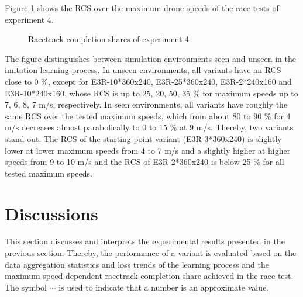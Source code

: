 Figure \ref{fig:e4_racing} shows the
RCS over the maximum drone speeds
of the race tests of experiment 4.
\begin{figure}
    \centering
    \hspace*{0cm}
    \par
    \caption[
        Racetrack completion shares of experiment 4
    ]{
        Racetrack completion shares of experiment 4
        \label{fig:e4_racing}
    }
\end{figure}
The figure distinguishes between simulation environments seen and unseen in the imitation learning process.
In unseen environments,
all variants have an RCS close to 0 \%,
except for E3R-10*360x240, E3R-25*360x240, E3R-2*240x160 and E3R-10*240x160,
whose RCS is up to 25, 20, 50, 35 \% for maximum speeds up to 7, 6, 8, 7 m/s, respectively.
In seen environments,
all variants have roughly the same RCS over the tested maximum speeds,
which from about 80 to 90 \% for 4 m/s decreases
almost parabolically to 0 to 15 \% at 9 m/s.
Thereby, two variants stand out.
The RCS of the starting point variant (E3R-3*360x240) 
is slightly lower at lower maximum speeds from 4 to 7 m/s 
and a slightly higher at higher speeds from 9 to 10 m/s
and the RCS of E3R-2*360x240 is below 25 \% for all tested maximum speeds.






\section{Discussions}
\label{discussions}
This section discusses and interprets the experimental results presented in the previous section.
Thereby, the performance of a variant is evaluated based on 
the data aggregation statistics and loss trends of the learning process
and the maximum speed-dependent racetrack completion share achieved in the race test.
The symbol $\sim$ is used to indicate that a number is an approximate value.


